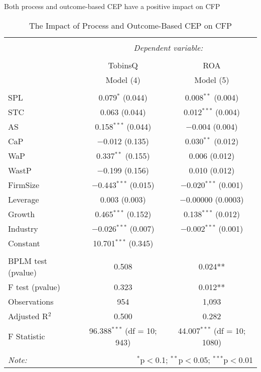 \documentclass[ignorenonframetext,]{beamer}
\begin{document}
\begin{frame}{Both process and outcome-based CEP have a positive impact
on CFP}

\begin{table}[!] \centering 
  \caption{The Impact of Process and Outcome-Based CEP on CFP} 
  \label{Lag1} 
\tiny 
\begin{tabular}{@{\extracolsep{5pt}}lcc} 
\\[-1.8ex]\hline 
\hline \\[-1.8ex] 
 & \multicolumn{2}{c}{\textit{Dependent variable:}} \\ 
\cline{2-3} 
\\[-1.8ex] & TobinsQ & ROA \\ 
 & Model (4) & Model (5) \\ 
\hline \\[-1.8ex] 
 SPL & 0.079$^{*}$ (0.044) & 0.008$^{**}$ (0.004) \\ 
  STC & 0.063 (0.044) & 0.012$^{***}$ (0.004) \\ 
  AS & 0.158$^{***}$ (0.044) & $-$0.004 (0.004) \\ 
  CaP & $-$0.012 (0.135) & 0.030$^{**}$ (0.012) \\ 
  WaP & 0.337$^{**}$ (0.155) & 0.006 (0.012) \\ 
  WastP & $-$0.199 (0.156) & 0.010 (0.012) \\ 
  FirmSize & $-$0.443$^{***}$ (0.015) & $-$0.020$^{***}$ (0.001) \\ 
  Leverage & 0.003 (0.003) & $-$0.00000 (0.0003) \\ 
  Growth & 0.465$^{***}$ (0.152) & 0.138$^{***}$ (0.012) \\ 
  Industry & $-$0.026$^{***}$ (0.007) & $-$0.002$^{***}$ (0.001) \\ 
  Constant & 10.701$^{***}$ (0.345) &  \\ 
 \hline \\[-1.8ex] 
BPLM test (pvalue) & 0.508 & 0.024** \\ 
F test (pvalue) & 0.323 & 0.012** \\ 
Observations & 954 & 1,093 \\ 
Adjusted R$^{2}$ & 0.500 & 0.282 \\ 
F Statistic & 96.388$^{***}$ (df = 10; 943) & 44.007$^{***}$ (df = 10; 1080) \\ 
\hline 
\hline \\[-1.8ex] 
\textit{Note:}  & \multicolumn{2}{r}{$^{*}$p$<$0.1; $^{**}$p$<$0.05; $^{***}$p$<$0.01} \\ 
\end{tabular} 
\end{table}

\end{frame}
\end{document}
